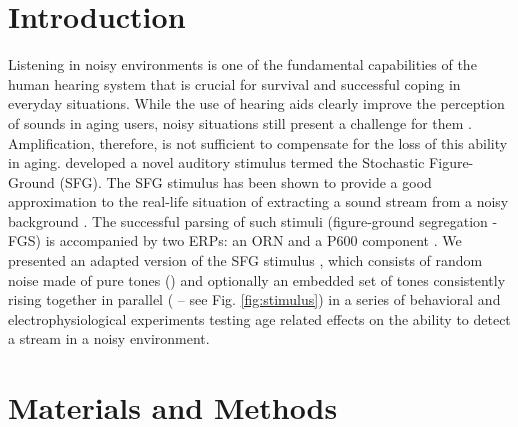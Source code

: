 \documentclass[a0,landscape]{a0poster}
\begin{document}
\vspace{0cm} %


\begin{multicols}{3} %


\color{DarkSlateGray} %

\section*{Introduction}
\large
Listening in noisy environments is one of the fundamental capabilities of the human hearing system that is crucial for survival and successful coping in everyday situations. While the use of hearing aids clearly improve the perception of sounds in aging users, noisy situations still present a challenge for them \autocite{Wu2013}. Amplification, therefore, is not sufficient to compensate for the loss of this ability in aging. \textcite{Teki2011} developed a novel auditory stimulus termed the Stochastic Figure-Ground (SFG). The SFG stimulus has been shown to provide a good approximation to the real-life situation of extracting a sound stream from a noisy background \autocite{Dykstra2017, Teki2013}. The successful parsing of such stimuli (figure-ground segregation - FGS) is accompanied by two ERPs: an ORN and a P600 component \autocite{Dykstra2017, Toth2016}. We presented an adapted version of the SFG stimulus \autocite{OSullivan2015}, which consists of random noise made of pure tones () and optionally an embedded set of tones consistently rising together in parallel ( -- see Fig. \ref{fig:stimulus}) in a series of behavioral and electrophysiological experiments testing age related effects on the ability to detect a stream in a noisy environment.

\section*{Materials and Methods}


\end{multicols}
\end{document}
